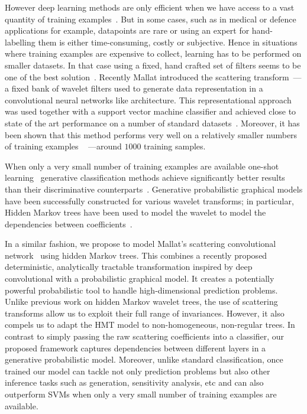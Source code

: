 \documentclass{article}
\begin{document}
  However deep learning methods are only efficient when we have access to a vast quantity of training examples~\cite{glorot2010understanding}. But in some cases, such as in medical or defence applications for example, datapoints are rare or using an expert for hand-labelling them is either time-consuming, costly or subjective. Hence in situations where training examples are expensive to collect, learning has to be performed on smaller
  datasets. In that case using a fixed, hand crafted set of filters seems to be one of the best solution~\cite{hsiang2001embedded}. Recently Mallat introduced the scattering transform~\cite{mallat2012gis}--- a fixed bank of wavelet filters used to generate data representation in a convolutional neural networks like architecture. This representational approach was used together with a support vector machine classifier and achieved close to state of the art performance on a number of standard datasets~\cite{bruna2010classification}. Moreover, it has been shown that this method performs very well on a relatively smaller numbers of training examples ~\cite{sifre2013rotation} ---\ie around $1000$ training samples.

  When only a very small number of training examples are available one-shot learning~\cite{fei2006one} generative classification methods achieve significantly better results than their discriminative counterparts~\cite{jordan2002discriminative}. Generative probabilistic graphical models have been successfully constructed for various wavelet transforms; in particular, Hidden Markov trees have been used to model the wavelet to model the dependencies between coefficients~\cite{crouse1998wavelet, kingsbury2001complex, durand2004computational}.
  
  In a similar fashion, we propose to model Mallat's scattering convolutional network~\cite{bruna2010classification} using hidden Markov trees. This combines a recently proposed deterministic, analytically tractable transformation inspired by deep convolutional with a probabilistic graphical model. It creates a potentially powerful probabilistic tool to handle high-dimensional prediction problems. Unlike previous work on hidden Markov wavelet trees, the use of scattering transforms allow us to exploit their full range of invariances. However, it also compels us to adapt the HMT model to non-homogeneous, non-regular trees. In contrast to simply passing the raw scattering coefficients into a classifier, our proposed framework captures dependencies between different layers in a generative probabilistic model. Moreover, unlike standard classification, once
  trained our model can tackle not only prediction problems but also other inference tasks such as generation, sensitivity analysis, etc and can also outperform SVMs when only a very small number of training examples are available.
\end{document}
